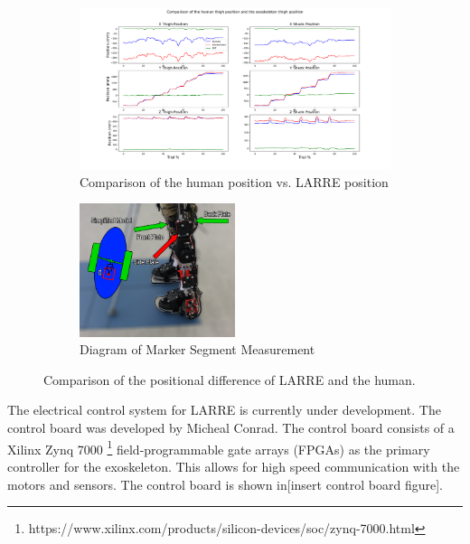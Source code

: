 \begin{figure}[h!]

    \begin{subfigure}{\textwidth}
        \centering
        \captionsetup{justification=centering}
        \centerline{
        \includegraphics[width=\textwidth, frame]{images/mech_design/position_comparison.png}}
        \caption[Comparison of Difference of Human and LARRE Position]{Comparison of the human position vs. LARRE position}
        \label{fig:positioncomparison}
    \end{subfigure}
        \begin{subfigure}{\textwidth}
        \centering
        \captionsetup{justification=centering}
        \centerline{
        \includegraphics[width=0.5\textwidth, frame]{images/mech_design/side_marker_positioning.png}}
        \caption[Diagram of Marker Segment Measurement]{Diagram of Marker Segment Measurement}
        \label{fig:markerpositiondiagram}
    \end{subfigure}
    \caption[Comparison of LARRE and human positions]{Comparison of the positional difference of LARRE and the human.}
    \label{fig:exohumanmarkercompare}
\end{figure}


The electrical control system for LARRE is currently under development. The control board was developed by Micheal Conrad. The control board consists of a  Xilinx Zynq 7000 \footnote{https://www.xilinx.com/products/silicon-devices/soc/zynq-7000.html}  field-programmable gate arrays (FPGAs) as the primary controller for the exoskeleton. This allows for high speed communication with the motors and sensors. The control board is shown in[insert control board figure].

